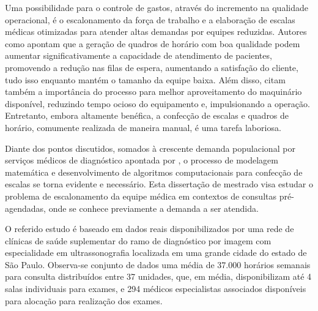 Uma possibilidade para o controle de gastos, através do incremento na qualidade operacional, é o escalonamento da força de trabalho e a elaboração de escalas médicas otimizadas para atender altas demandas por equipes reduzidas. Autores como  apontam que a geração de quadros de horário com boa qualidade podem aumentar significativamente a capacidade de atendimento de pacientes, promovendo a redução nas filas de espera, aumentando a satisfação do cliente, tudo isso enquanto mantém o tamanho da equipe baixa. Além disso,  citam também a importância do processo para melhor aproveitamento do maquinário disponível, reduzindo tempo ocioso do equipamento e, impulsionando a operação. 
Entretanto, embora altamente benéfica, a confecção de escalas e quadros de horário, comumente realizada de maneira manual, é uma tarefa laboriosa.

Diante dos pontos discutidos, somados à crescente demanda populacional por serviços médicos de diagnóstico apontada por , o processo de modelagem matemática e desenvolvimento de algoritmos computacionais para confecção de escalas se torna evidente e necessário. Esta dissertação de mestrado visa estudar o problema de escalonamento da equipe médica em contextos de consultas pré-agendadas, onde se conhece previamente a demanda a ser atendida.

O referido estudo é baseado em dados reais disponibilizados por uma rede de clínicas de saúde suplementar do ramo de diagnóstico por imagem com especialidade em ultrassonografia localizada em uma grande cidade do estado de São Paulo. Observa-se conjunto de dados uma média de 37.000 horários semanais para consulta distribuídos entre 37 unidades, que, em média, disponibilizam até 4 salas individuais para exames, e 294 médicos especialistas associados disponíveis para alocação para realização dos exames. 

